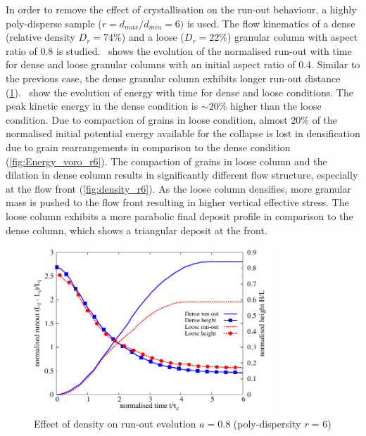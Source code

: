 In order to remove the effect of crystallisation on the run-out behaviour, a 
highly poly-disperse sample ($r = d_{max}/d_{min} = 6)$ is used. 
The flow kinematics of a dense (relative density $D_r = 74\%$) and a loose 
($D_r = 22\%$) granular column with aspect ratio of 0.8 is 
studied.~ shows the evolution of the 
normalised run-out with time for dense and loose granular columns with an 
initial aspect ratio of 0.4. Similar to 
the previous case, the dense granular column exhibits longer run-out distance 
(\cref{fig:runout_height_dense_r6}).~ show the 
evolution of energy with time for dense and loose conditions. The peak kinetic 
energy in the dense condition is $\sim 20\%$ higher than the loose 
condition. Due to compaction of grains in loose condition, almost 20\% of the 
normalised initial potential energy available for the collapse is lost in 
densification due to grain rearrangements in comparison to the dense 
condition (\cref{fig:Energy_voro_r6}). The compaction of grains in loose 
column and the dilation in dense column results in significantly different flow 
structure, especially at the flow front (\cref{fig:density_r6}). As the loose 
column densifies, more granular mass is pushed to the flow front resulting in 
higher vertical effective stress. The loose column exhibits a more parabolic 
final deposit profile in comparison to the dense column, which shows a 
triangular deposit at the front.

\begin{figure}[tbhp]
\centering
\includegraphics[width=0.8\textwidth]{runout_height_dense_r6}
\caption{Effect of density on run-out evolution $a = 0.8$ (poly-dispersity 
\textit{r} = 6)}
\label{fig:runout_height_dense_r6}
\end{figure}


